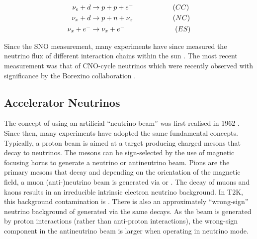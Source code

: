 \begin{equation}
  \label{eq:NeutrinoOscillationPhysics_SNOInteractions}
  \begin{split}
    \nu_{e} + d &\rightarrow p + p + e^{-} \hspace{2cm} (CC) \\
    \nu_{x} + d &\rightarrow p + n + \nu_{x} \hspace{2.02cm} (NC) \\
    \nu_{x} + e^{-} &\rightarrow \nu_{x} + e^{-} \hspace{2.55cm} (ES)
  \end{split}
\end{equation}

Since the SNO measurement, many experiments have since measured the neutrino flux of different interaction chains within the sun \cite{Borexino_Collaboration2018-of, Aharmim2006-yb, Agostini2020-so}. The most recent measurement was that of CNO-cycle neutrinos which were recently observed with \quickmath{5\sigma} significance by the Borexino collaboration \cite{Borexino_Collaboration2018-of}.

\subsection{Accelerator Neutrinos}
\label{subsec:NeutrinoOscillationPhysics_AcceleratorNeutrinos}

The concept of using an artificial ``neutrino beam'' was first realised in 1962 \cite{Danby1962-ph}.
Since then, many experiments have adopted the same fundamental concepts. Typically, a proton beam is aimed at a target producing charged mesons that decay to neutrinos. The mesons can be sign-selected by the use of magnetic focusing horns to generate a neutrino or antineutrino beam.
Pions are the primary mesons that decay and depending on the orientation of the magnetic field, a muon (anti-)neutrino beam is generated via \quickmath{\pi^{+} \rightarrow \mu^{+} + \nu_{\mu}} or \quickmath{\pi^{-} \rightarrow \mu^{-} + \bar{\nu}_{\mu}}. The decay of muons and kaons results in an irreducible intrinsic electron neutrino background. In T2K, this background contamination is  \cite{Abe_2013}. There is also an approximately  ``wrong-sign'' neutrino background of \quickmath{\bar{\nu}_{\mu}} generated via the same decays. As the beam is generated by proton interactions (rather than anti-proton interactions), the wrong-sign component in the antineutrino beam is larger when operating in neutrino mode.

